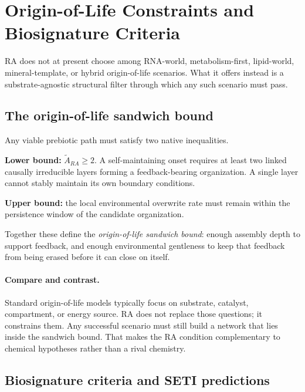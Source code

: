 \documentclass[11pt]{article}
\def\mathrm#1{#1}%
\begin{document}
\section{Origin-of-Life Constraints and Biosignature Criteria}
\label{sec:origin}

RA does not at present choose among RNA-world, metabolism-first, lipid-world, mineral-template, or hybrid origin-of-life scenarios. What it offers instead is a substrate-agnostic structural filter through which any such scenario must pass.

\subsection{The origin-of-life sandwich bound}
\label{sec:sandwich}

Any viable prebiotic path must satisfy two native inequalities.

\textbf{Lower bound:} $\tilde{A}_{\mathrm{RA}} \ge 2$. A self-maintaining onset requires at least two linked causally irreducible layers forming a feedback-bearing organization. A single layer cannot stably maintain its own boundary conditions.

\textbf{Upper bound:} the local environmental overwrite rate must remain within the persistence window of the candidate organization.

Together these define the \emph{origin-of-life sandwich bound}: enough assembly depth to support feedback, and enough environmental gentleness to keep that feedback from being erased before it can close on itself.

\paragraph{Compare and contrast.} Standard origin-of-life models typically focus on substrate, catalyst, compartment, or energy source. RA does not replace those questions; it constrains them. Any successful scenario must still build a network that lies inside the sandwich bound. That makes the RA condition complementary to chemical hypotheses rather than a rival chemistry.

\subsection{Biosignature criteria and SETI predictions}
\label{sec:seti}
\end{document}
